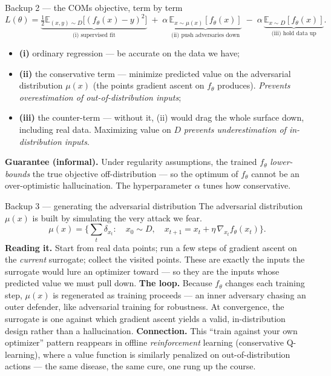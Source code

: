 \documentclass[10pt, aspectratio=169]{beamer}
\begin{document}
\begin{frame}{Backup 2 --- the COMs objective, term by term}
\footnotesize
\[
L(\theta) = \underbrace{\tfrac12 \mathbb{E}_{(x,y)\sim D}\big[(f_\theta(x)-y)^2\big]}_{\text{(i) supervised fit}}
\;+\; \alpha\,\underbrace{\mathbb{E}_{x\sim\mu(x)}[f_\theta(x)]}_{\text{(ii) push adversaries down}}
\;-\; \alpha\,\underbrace{\mathbb{E}_{x\sim D}[f_\theta(x)]}_{\text{(iii) hold data up}}.
\]
\begin{itemize}\setlength\itemsep{1pt}
\item \textbf{(i)} ordinary regression --- be accurate on the data we have;
\item \textbf{(ii)} the conservative term --- minimize predicted value on the adversarial distribution $\mu(x)$ (the points gradient ascent on $f_\theta$ produces). \emph{Prevents overestimation of out-of-distribution inputs};
\item \textbf{(iii)} the counter-term --- without it, (ii) would drag the whole surface down, including real data. Maximizing value on $D$ \emph{prevents underestimation of in-distribution inputs}.
\end{itemize}
\medskip
\textbf{Guarantee (informal).} Under regularity assumptions, the trained $f_\theta$ \emph{lower-bounds} the true objective off-distribution --- so the optimum of $f_\theta$ cannot be an over-optimistic hallucination. The hyperparameter $\alpha$ tunes how conservative.
\end{frame}

\begin{frame}{Backup 3 --- generating the adversarial distribution}
\footnotesize
The adversarial distribution $\mu(x)$ is built by simulating the very attack we fear.
\[
\mu(x) = \Big\{\textstyle\sum_{t} \delta_{x_t} : \quad x_0 \sim D, \quad x_{t+1} = x_t + \eta\,\nabla_{x_t} f_\theta(x_t)\Big\}.
\]
\textbf{Reading it.} Start from real data points; run a few steps of gradient ascent on the \emph{current} surrogate; collect the visited points. These are exactly the inputs the surrogate would lure an optimizer toward --- so they are the inputs whose predicted value we must pull down.
\medskip
\textbf{The loop.} Because $f_\theta$ changes each training step, $\mu(x)$ is regenerated as training proceeds --- an inner adversary chasing an outer defender, like adversarial training for robustness. At convergence, the surrogate is one against which gradient ascent yields a valid, in-distribution design rather than a hallucination.
\medskip
\textbf{Connection.} This ``train against your own optimizer'' pattern reappears in offline \emph{reinforcement} learning (conservative Q-learning), where a value function is similarly penalized on out-of-distribution actions --- the same disease, the same cure, one rung up the course.
\end{frame}
\end{document}
